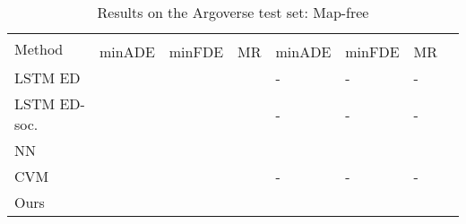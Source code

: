 \documentclass[letterpaper, 10 pt, conference]{ieeeconf}
\begin{document}
\begin{table*}[thpb]
	\begin{minipage}{\columnwidth}
		\caption{Results on the Argoverse test set: Map-free}
		\label{tab:results_test_map_free}
		\setlength{\tabcolsep}{2.3pt}
		\centering
		\begin{tabularx}{\columnwidth}{Xlllllll}
			\toprule
			\multirow{2}{*}{Method}       &              \multicolumn{3}{c}{}              &              \multicolumn{3}{c}{}              &  \\
			                              & minADE          & minFDE          & MR              & minADE          & minFDE          & MR              &  \\ \midrule
			LSTM ED \cite{Chang2019}      &           &           &           & -               & -               & -               &  \\
			LSTM ED-soc. \cite{Chang2019} &           &           &           & -               & -               & -               &  \\
			NN \cite{Chang2019}           &           &           &           &           &           &           &  \\
			CVM \cite{Chang2019}          &           &           &           & -               & -               & -               &  \\ \midrule
			Ours                          &  &  &  &  &  &  &  \\ \bottomrule
		\end{tabularx}
	\end{minipage}
	\hfill
	\begin{minipage}{\columnwidth}
		\vspace{0.18cm}
		\centering
		\begin{adjustbox}{clip, trim=0cm 0.1cm 0cm 0cm}

\end{adjustbox}
\end{minipage}
\end{table*}
\end{document}
